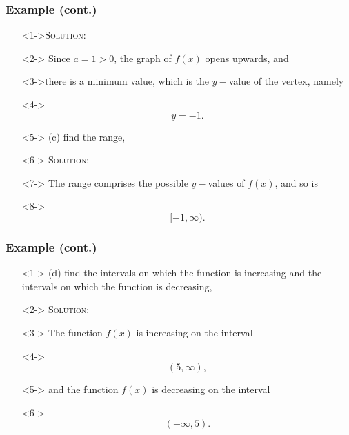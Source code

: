 \documentclass[handout]{beamer}
\begin{document}
\begin{frame}
	\frametitle{Example (cont.)} 
	\begin{enumerate} 
		\item[]<1->\textsc{Solution:} 
		\item[]<2-> Since $a=1>0$, the graph of $f(x)$ opens upwards, and
		\item[]<3->there is a minimum value, which is the $y-$value of the vertex, namely
		\item[]<4-> \[ y=-1.\] 
		\item[]<5-> (c) find the range, 
		\item[]<6-> \textsc{Solution:} 
		\item[]<7-> The range comprises the possible $y-$values of $f(x)$, and so is 
		\item[]<8-> \[ [-1, \infty).  \]
	\end{enumerate}
\end{frame}

\begin{frame}
	\frametitle{Example (cont.)} 
	\begin{enumerate}
		\item[]<1-> (d) find the intervals on which the function is increasing and the intervals on which the function is decreasing, 
		\item[]<2-> \textsc{Solution:} 
		\item[]<3-> The function $f(x)$ is increasing on the interval
		\item[]<4-> \[ (5, \infty),\]
		\item[]<5-> and the function $f(x)$ is decreasing on the interval 
		\item[]<6-> \[ (-\infty, 5). \] 
	\end{enumerate}
\end{frame}
\end{document}
